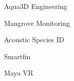 \item Aqua3D Engineering
\item Mangrove Monitoring
\item Acoustic Species ID
\item Smartfin
\item Maya VR
